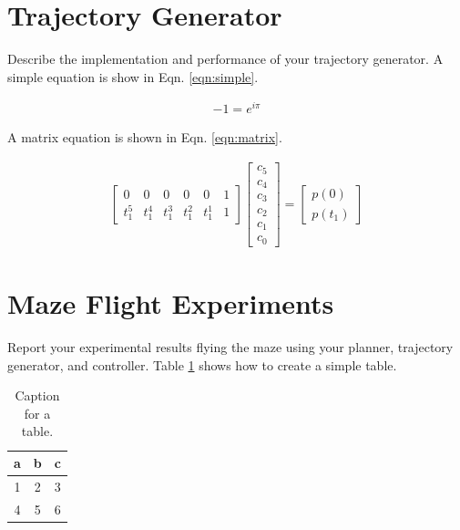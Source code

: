\documentclass[letterpaper, 10 pt, conference]{ieeeconf}
\begin{document}
\section{Trajectory Generator}

Describe the implementation and performance of your trajectory generator.
A simple equation is show in Eqn. \ref{eqn:simple}.

\begin{align}
-1 = e^{i \pi}
\label{eqn:simple}
\end{align}

A matrix equation is shown in Eqn. \ref{eqn:matrix}.

\begin{align}
\begin{bmatrix}
0 & 0 & 0 & 0 & 0 & 1 \\
t_1^5 & t_1^4 & t_1^3 & t_1^2 & t_1^1 & 1
\end{bmatrix}
\begin{bmatrix}
c_5 \\ c_4 \\ c_3 \\ c_2 \\ c_1 \\ c_0 
\end{bmatrix}
=
\begin{bmatrix}
p(0) \\
p(t_1)
\end{bmatrix}
\label{eqn:matrix}
\end{align}

\section{Maze Flight Experiments}

Report your experimental results flying the maze using your planner, trajectory generator, and controller.
Table \ref{tab:simple_table} shows how to create a simple table.

\begin{table}[h]
  \centering
  \begin{tabular}{c|c|c}
    a & b & c \\
    \hline
    1 & 2 & 3 \\
    4 & 5 & 6
  \end{tabular}
  \caption{Caption for a table.}
  \label{tab:simple_table}
\end{table}

\end{document}

